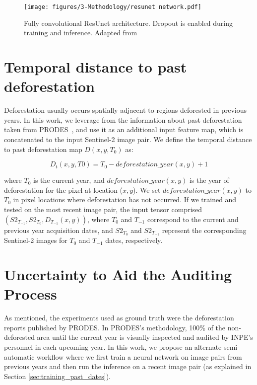 \begin{figure*}[h!]
\centering
\texttt{[image: figures/3-Methodology/resunet network.pdf]}
\caption{Fully convolutional ResUnet architecture. Dropout is enabled during training and inference. Adapted from \cite{ortega2021comparison}}
\label{fig:resunet}
\end{figure*}

\section{Temporal distance to past deforestation}

Deforestation usually occurs spatially adjacent to regions deforested in previous years. In this work, we leverage from the information about past deforestation taken from PRODES~\cite{prodes}, and use it as an additional input feature map, which is concatenated to the input Sentinel-2 image pair. We define the temporal distance to past deforestation map $D(x,y,T_0)$ as:

\[D_t(x,y,T0) = T_0 - deforestation\_year(x,y) + 1\]

\noindent
where $T_0$ is the current year, and $deforestation\_year(x,y)$ is the year of deforestation for the pixel at location ($x,y$). We set $deforestation\_year(x,y)$ to $T_0$ in pixel locations where deforestation has not occurred. If we trained and tested on the most recent image pair, the input tensor comprised $(S2_{T_{-1}}, S2_{T_{0}}, D_{T_{-1}}(x,y))$, where $T_0$ and $T_{-1}$ correspond to the current and previous year acquisition dates, and $S2_{T_{0}}$ and $S2_{T_{-1}}$ represent the corresponding Sentinel-2 images for $T_0$ and $T_{-1}$ dates, respectively.

\section{Uncertainty to Aid the Auditing Process}


As mentioned, the experiments used as ground truth were the deforestation reports published by PRODES. In PRODES's methodology, 100\% of the non-deforested area until the current year is visually inspected and audited by INPE's personnel in each upcoming year. In this work, we propose an alternate semi-automatic workflow where we first train a neural network on image pairs from previous years and then run the inference on a recent image pair (as explained in Section \ref{sec:training_past_dates}). 

